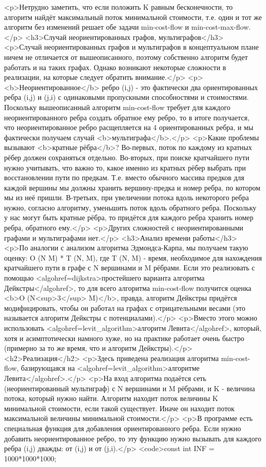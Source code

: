 <p>Нетрудно заметить, что если положить K равным бесконечности, то алгоритм найдёт максимальный поток минимальной стоимости, т.е. один и тот же алгоритм без изменений решает обе задачи min-cost-flow и min-cost-max-flow.</p>
<h3>Случай неориентированных графов, мультиграфов</h3>
<p>Случай неориентированных графов и мультиграфов в концептуальном плане ничем не отличается от вышеописанного, поэтому собственно алгоритм будет работать и на таких графах. Однако возникают некоторые сложности в реализации, на которые следует обратить внимание.</p>
<p><b>Неориентированное</b> ребро (i,j) - это фактически два ориентированных ребра (i,j) и (j,i) с одинаковыми пропускными способностями и стоимостями. Поскольку вышеописанный алгоритм min-cost-flow требует для каждого неориентированного ребра создать обратное ему ребро, то в итоге получается, что неориентированное ребро расщепляется на 4 ориентированных ребра, и мы фактически получаем случай <b>мультиграфа</b>.</p>
<p>Какие проблемы вызывают <b>кратные рёбра</b>? Во-первых, поток по каждому из кратных рёбер должен сохраняться отдельно. Во-вторых, при поиске кратчайшего пути нужно учитывать, что важно то, какое именно из кратных рёбер выбрать при восстановлении пути по предкам. Т.е. вместо обычного массива предков для каждой вершины мы должны хранить вершину-предка и номер ребра, по котором мы из неё пришли. В-третьих, при увеличении потока вдоль некоторого ребра нужно, согласно алгоритму, уменьшить поток вдоль обратного ребра. Поскольку у нас могут быть кратные рёбра, то придётся для каждого ребра хранить номер ребра, обратного ему.</p>
<p>Других сложностей с неориентированными графами и мультиграфами нет.</p>
<h3>Анализ времени работы</h3>
<p>По аналогии с анализом алгоритма Эдмондса-Карпа, мы получаем такую оценку: O (N M) * T (N, M), где T (N, M) - время, необходимое для нахождения кратчайшего пути в графе с N вершинами и M рёбрами. Если это реализовать с помощью <algohref=dijkstra>простейшего варианта алгоритма Дейкстры</algohref>, то для всего алгоритма min-cost-flow получится оценка <b>O (N<sup>3</sup> M)</b>, правда, алгоритм Дейкстры придётся модифицировать, чтобы он работал на графах с отрицательными весами (это называется алгоритм Дейкстры с потенциалами).</p>
<p>Вместо этого можно использовать <algohref=levit_algorithm>алгоритм Левита</algohref>, который, хотя и асимптотически намного хуже, но на практике работает очень быстро (примерно за то же время, что и алгоритм Дейкстры).</p>
<h2>Реализация</h2>
<p>Здесь приведена реализация алгоритма min-cost-flow, базирующаяся на <algohref=levit_algorithm>алгоритме Левита</algohref>.</p>
<p>На вход алгоритма подаётся сеть (неориентированный мультиграф) с N вершинами и M рёбрами, и K - величина потока, который нужно найти. Алгоритм находит поток величины K минимальной стоимости, если такой существует. Иначе он находит поток максимальной величины минимальной стоимости.</p>
<p>В программе есть специальная функция для добавления ориентированного ребра. Если нужно добавить неориентированное ребро, то эту функцию нужно вызывать для каждого ребра (i,j) дважды: от (i,j) и от (j,i).</p>
<code>const int INF = 1000*1000*1000;

